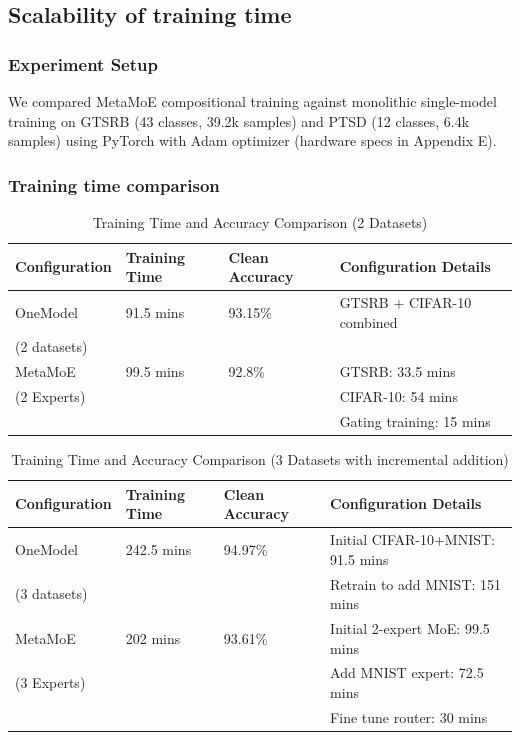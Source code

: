 \documentclass[11pt,a4paper]{article}
\begin{document}
\subsection{Scalability of training time}

\subsubsection{Experiment Setup}

We compared MetaMoE compositional training against monolithic single-model training on GTSRB (43 classes, 39.2k samples) and PTSD (12 classes, 6.4k samples) using PyTorch with Adam optimizer (hardware specs in Appendix E).

\subsubsection{Training time comparison}

\begin{table}[H]
\centering
\begin{tabular}{llll}
\toprule
\textbf{Configuration} & \textbf{Training Time} & \textbf{Clean Accuracy} & \textbf{Configuration Details} \\
\midrule
OneModel & 91.5 mins & 93.15\% & GTSRB + CIFAR-10 combined \\
(2 datasets) & & & \\
MetaMoE & 99.5 mins & 92.8\% & GTSRB: 33.5 mins \\
(2 Experts) & & & CIFAR-10: 54 mins \\
 & & & Gating training: 15 mins \\
\bottomrule
\end{tabular}
\caption{Training Time and Accuracy Comparison (2 Datasets)}
\end{table}

\begin{table}[H]
\centering
\begin{tabular}{llll}
\toprule
\textbf{Configuration} & \textbf{Training Time} & \textbf{Clean Accuracy} & \textbf{Configuration Details} \\
\midrule
OneModel & 242.5 mins & 94.97\% & Initial CIFAR-10+MNIST: 91.5 mins \\
(3 datasets) & & & Retrain to add MNIST: 151 mins \\
MetaMoE & 202 mins & 93.61\% & Initial 2-expert MoE: 99.5 mins \\
(3 Experts) & & & Add MNIST expert: 72.5 mins \\
 & & & Fine tune router: 30 mins \\
\bottomrule
\end{tabular}
\caption{Training Time and Accuracy Comparison (3 Datasets with incremental addition)}
\end{table}
\end{document}
